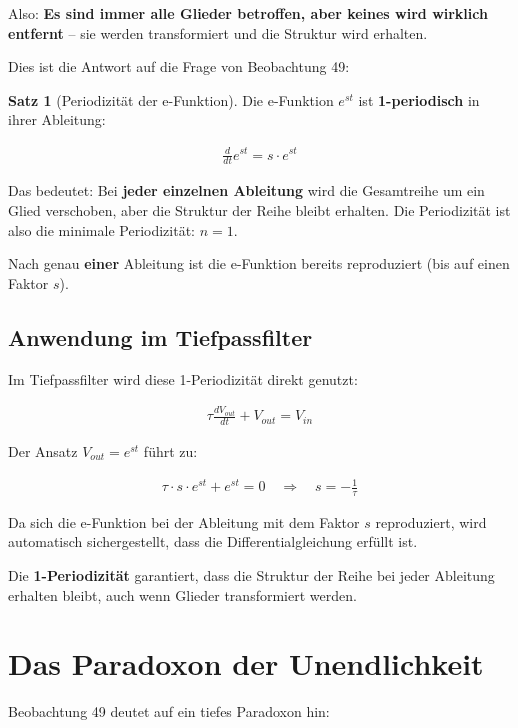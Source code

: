 \documentclass[a4paper, 12pt, twoside, openright]{report}
\theoremstyle{definition}
\theoremstyle{definition}
\newtheorem{satz}{Satz}[chapter]
\begin{document}
Also: \textbf{Es sind immer alle Glieder betroffen, aber keines wird wirklich entfernt} -- sie werden transformiert und die Struktur wird erhalten.

Dies ist die Antwort auf die Frage von Beobachtung 49:

\begin{satz}[Periodizität der e-Funktion]
	Die e-Funktion $e^{st}$ ist \textbf{1-periodisch} in ihrer Ableitung:
	
	\begin{align}
		\frac{d}{dt} e^{st} = s \cdot e^{st}
	\end{align}
	
	Das bedeutet: Bei \textbf{jeder einzelnen Ableitung} wird die Gesamtreihe um ein Glied verschoben, aber die Struktur der Reihe bleibt erhalten. Die Periodizität ist also die minimale Periodizität: $n = 1$.
	
	Nach genau \textbf{einer} Ableitung ist die e-Funktion bereits reproduziert (bis auf einen Faktor $s$).
\end{satz}

\subsection{Anwendung im Tiefpassfilter}

Im Tiefpassfilter wird diese 1-Periodizität direkt genutzt:

\begin{align}
	\tau \frac{dV_{out}}{dt} + V_{out} = V_{in}
\end{align}

Der Ansatz $V_{out} = e^{st}$ führt zu:

\begin{align}
	\tau \cdot s \cdot e^{st} + e^{st} = 0 \quad \Rightarrow \quad s = -\frac{1}{\tau}
\end{align}

Da sich die e-Funktion bei der Ableitung mit dem Faktor $s$ reproduziert, wird automatisch sichergestellt, dass die Differentialgleichung erfüllt ist.

Die \textbf{1-Periodizität} garantiert, dass die Struktur der Reihe bei jeder Ableitung erhalten bleibt, auch wenn Glieder transformiert werden.

\section{Das Paradoxon der Unendlichkeit}

Beobachtung 49 deutet auf ein tiefes Paradoxon hin:
\end{document}
